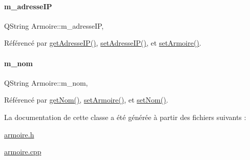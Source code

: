 \paragraph{\texorpdfstring{m\+\_\+adresse\+IP}{m\_adresseIP}}
{\footnotesize\ttfamily Q\+String Armoire\+::m\+\_\+adresse\+IP\hspace{0.3cm}{\ttfamily [read]}, {\ttfamily [write]}}



Référencé par \hyperlink{class_armoire_a5196fec5f44f63216ddce5fbc512c919}{get\+Adresse\+I\+P()}, \hyperlink{class_armoire_a0be45a8a0574139b955cc1f1b51a40d6}{set\+Adresse\+I\+P()}, et \hyperlink{class_armoire_a4b35e93cee5c78739ba543162e4dbfaa}{set\+Armoire()}.

\mbox{\label{class_armoire_a6d5fc6a37737b4822dc89191a79f6b7b}} 
\paragraph{\texorpdfstring{m\+\_\+nom}{m\_nom}}
{\footnotesize\ttfamily Q\+String Armoire\+::m\+\_\+nom\hspace{0.3cm}{\ttfamily [read]}, {\ttfamily [write]}}



Référencé par \hyperlink{class_armoire_a0045e45e0c9a465af765667344ce8bee}{get\+Nom()}, \hyperlink{class_armoire_a4b35e93cee5c78739ba543162e4dbfaa}{set\+Armoire()}, et \hyperlink{class_armoire_ab05030741c5930bb73a8fef5b378ed37}{set\+Nom()}.



La documentation de cette classe a été générée à partir des fichiers suivants \+:\begin{DoxyCompactItemize}
\item 
\hyperlink{armoire_8h}{armoire.\+h}\item 
\hyperlink{armoire_8cpp}{armoire.\+cpp}\end{DoxyCompactItemize}
